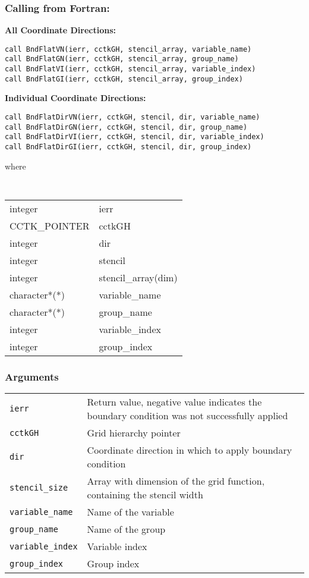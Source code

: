 \documentclass{article}
\begin{document}
\subsubsection*{Calling from Fortran:}

{\bf All Coordinate Directions:}
\begin{verbatim}
call BndFlatVN(ierr, cctkGH, stencil_array, variable_name)
call BndFlatGN(ierr, cctkGH, stencil_array, group_name)
call BndFlatVI(ierr, cctkGH, stencil_array, variable_index)
call BndFlatGI(ierr, cctkGH, stencil_array, group_index)
\end{verbatim}

\noindent
{\bf Individual Coordinate Directions:}
\begin{verbatim}
call BndFlatDirVN(ierr, cctkGH, stencil, dir, variable_name)
call BndFlatDirGN(ierr, cctkGH, stencil, dir, group_name)
call BndFlatDirVI(ierr, cctkGH, stencil, dir, variable_index)
call BndFlatDirGI(ierr, cctkGH, stencil, dir, group_index)
\end{verbatim}
where

{\tt
\begin{tabular}{ll}
integer & ierr \\
CCTK\_POINTER & cctkGH\\
integer & dir\\
integer & stencil\\
integer & stencil\_array(dim)\\
character*(*) & variable\_name\\
character*(*) & group\_name\\
integer & variable\_index\\
integer & group\_index
\end{tabular}
}

\subsubsection*{Arguments}
\begin{tabular}{ll}
{\tt ierr} & Return value, negative value indicates the
boundary condition was not successfully applied\\
{\tt cctkGH} & Grid hierarchy pointer\\
{\tt dir} & Coordinate direction in which to apply boundary condition\\
{\tt stencil\_size} & Array with dimension of the grid function, containing the stencil width\\
{\tt variable\_name} & Name of the variable\\
{\tt group\_name} & Name of the group\\
{\tt variable\_index} & Variable index\\
{\tt group\_index} & Group index\\
\end{tabular}
\end{document}
